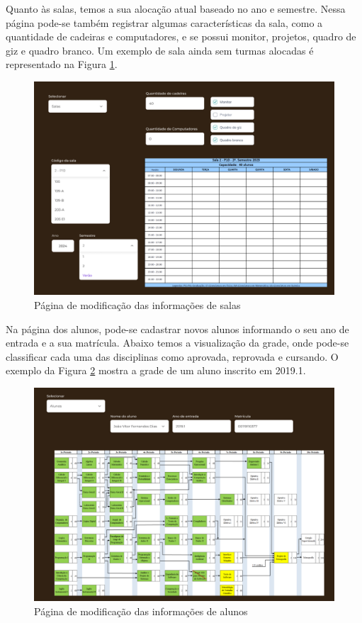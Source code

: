 Quanto às salas, temos a sua alocação atual baseado no ano e semestre. Nessa página pode-se também registrar algumas características da sala, como a quantidade de cadeiras e computadores, e se possui monitor, projetos, quadro de giz e quadro branco. Um exemplo de sala ainda sem turmas alocadas é representado na Figura \ref{fig:CRUD_salas-vazias}.

\begin{figure}[htbp]\centering
  \caption{\label{fig:CRUD_salas-vazias} Página de modificação das informações de salas}
  \includegraphics[scale=0.6]{files/img/Prototipo/Medio/CRUD_salas-vazias.png}
\end{figure} %

Na página dos alunos, pode-se cadastrar novos alunos informando o seu ano de entrada e a sua matrícula. Abaixo temos a visualização da grade, onde pode-se classificar cada uma das disciplinas como aprovada, reprovada e cursando. O exemplo da Figura \ref{fig:CRUD_alunos} mostra a grade de um aluno inscrito em 2019.1.

\begin{figure}[htbp]\centering
  \caption{\label{fig:CRUD_alunos} Página de modificação das informações de alunos}
  \includegraphics[scale=0.6]{files/img/Prototipo/Medio/CRUD_alunos.png}
\end{figure} %

